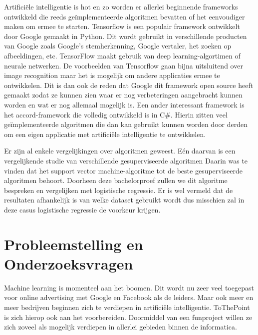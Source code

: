 Artificiële intelligentie is hot en zo worden er allerlei beginnende frameworks ontwikkeld die reeds geïmplementeerde algoritmen bevatten of het eenvoudiger maken om ermee te starten. 
Tensorflow is een populair framework ontwikkelt door Google gemaakt in Python. Dit wordt gebruikt in verschillende producten van Google zoals Google's stemherkenning, Google vertaler, het zoeken op afbeeldingen, etc.
TensorFlow maakt gebruik van deep learning-algortimen of neurale netwerken. De voorbeelden van Tensorflow gaan bijna uitsluitend over image recognition maar het is mogelijk om andere applicaties ermee te ontwikkelen. Dit is dan ook de reden dat Google dit framework open source heeft gemaakt zodat ze kunnen zien waar er nog verbeteringen aangebracht kunnen worden en wat er nog allemaal mogelijk is. \autocite{GooglesTensorflow}
Een ander interessant framework is het accord-framework \autocite{accord} die volledig ontwikkeld is in C\#. Hierin zitten veel geïmplementeerde algoritmen die dan kan gebruikt kunnen worden door derden om een eigen applicatie met artificiële intelligentie te ontwikkelen. 

Er zijn al enkele vergelijkingen over algoritmen geweest. Eén daarvan is een vergelijkende studie van verschillende gesuperviseerde algoritmen \autocite{vergelijkingSupervised} Daarin was te vinden dat het support vector machine-algoritme tot de beste gesuperviseerde algoritmen behoort. Doorheen deze bachelorproef zullen we dit algoritme bespreken en vergelijken met logistische regressie. Er is wel vermeld dat de resultaten afhankelijk is van welke dataset gebruikt wordt dus misschien zal in deze casus logistische regressie de voorkeur krijgen.

\section{Probleemstelling en Onderzoeksvragen}
\label{sec:onderzoeksvragen}


Machine learning is momenteel aan het boomen. Dit wordt nu zeer veel toegepast voor online advertising met Google en Facebook als de leiders. Maar ook meer en meer bedrijven beginnen zich te verdiepen in artificiële intelligentie. ToThePoint is zich hierop ook aan het voorbereiden. Doormiddel van een funproject willen ze zich zoveel als mogelijk verdiepen in allerlei gebieden binnen de informatica.

